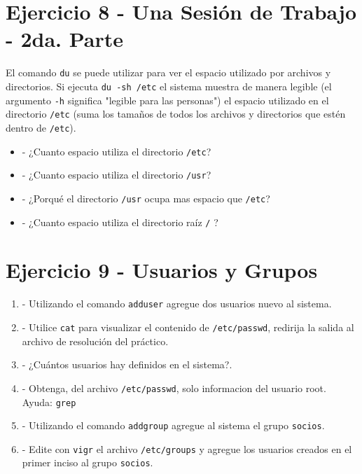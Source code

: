 \documentclass[12pt]{article}
\begin{document}
\section*{Ejercicio 8 - Una Sesión de Trabajo - 2da. Parte}
El comando \texttt{du} se puede utilizar para ver el espacio utilizado por archivos y directorios.
Si ejecuta \texttt{du -sh /etc} el sistema muestra de manera legible (el argumento \texttt{-h} significa "legible para las personas")
el espacio utilizado en el directorio \texttt{/etc} (suma los tamaños de todos los archivos y directorios que estén dentro de \texttt{/etc}).

\begin{itemize}
\item - ¿Cuanto espacio utiliza el directorio \texttt{/etc}?
\item - ¿Cuanto espacio utiliza el directorio \texttt{/usr}?
\item - ¿Porqué el directorio \texttt{/usr} ocupa mas espacio que \texttt{/etc}?
\item - ¿Cuanto espacio utiliza el directorio raíz \texttt{/} ?
\end{itemize}



\section*{Ejercicio 9 - Usuarios y Grupos}

	\begin{enumerate}
\item - Utilizando el comando \texttt{adduser} agregue dos usuarios nuevo al sistema.
\item - Utilice \texttt{cat} para visualizar el contenido de \texttt{/etc/passwd}, redirija la salida al archivo de resolución del práctico.
\item - ¿Cuántos usuarios hay definidos en el sistema?.
\item - Obtenga, del archivo \texttt{/etc/passwd}, solo informacion del usuario root. Ayuda: \texttt{grep}
\item - Utilizando el comando \texttt{addgroup} agregue al sistema el grupo \texttt{socios}.
\item - Edite con \texttt{vigr} el archivo \texttt{/etc/groups} y agregue los usuarios creados en el primer inciso al grupo \texttt{socios}.
	\end{enumerate}
\end{document}
